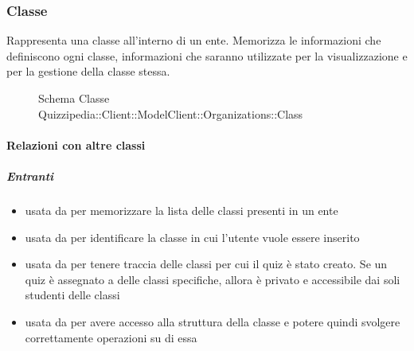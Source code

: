 \subsubsection{Classe }
Rappresenta una classe all'interno di un ente. Memorizza le informazioni che definiscono ogni classe,
informazioni che saranno utilizzate per la visualizzazione e per la gestione della classe stessa.
\begin{figure}[H]
\centering
\noindent{}
\caption[Schema Classe Class]{Schema Classe Quizzipedia::Client::ModelClient::Organizations::Class}
\end{figure}
\paragraph{Relazioni con altre classi}
\subparagraph{Entranti}
\begin{itemize}
\item usata da  per memorizzare la lista
delle classi presenti in un ente
\item usata da  per identificare la classe
in cui l'utente vuole essere inserito
\item usata da  per tenere traccia delle classi per
cui il quiz è stato creato. Se un quiz è assegnato a delle classi specifiche, allora è privato e
accessibile dai soli studenti delle classi
\item usata da  per avere
accesso alla struttura della classe e potere quindi svolgere correttamente operazioni su di
essa
\end{itemize}
